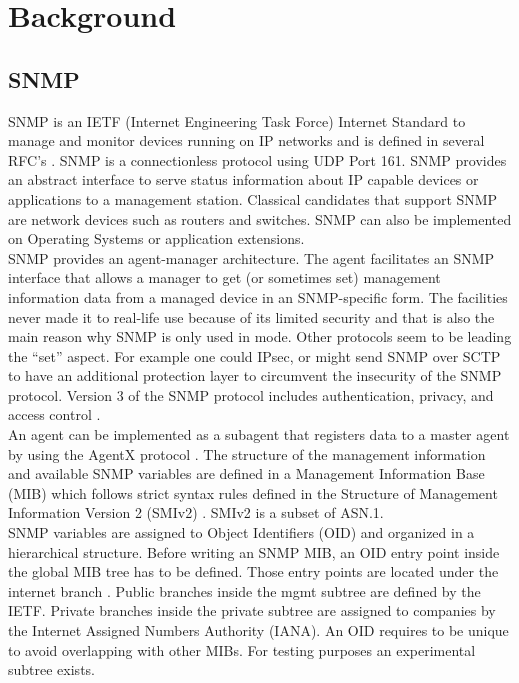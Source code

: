 \section{Background}
\label{chap:background}
\subsection{SNMP}
SNMP is an IETF (Internet Engineering Task Force) Internet Standard to manage and monitor devices running on IP networks and is defined in several RFC's \cite{snmp-rfc}. SNMP is a connectionless protocol using UDP Port 161. SNMP provides an abstract interface to serve status information about IP capable devices or applications to a management station. Classical candidates that support SNMP are network devices such as routers and switches. SNMP can also be implemented on Operating Systems or application extensions. 
\\
SNMP provides an agent-manager architecture. The agent facilitates an SNMP interface that allows a manager to get (or sometimes set) management information data from a managed device in an SNMP-specific form.
The  facilities never made it to real-life use because of its limited security and that is also the main reason why SNMP is only used in  mode. Other protocols seem to be leading the “set” aspect. For example one could IPsec, or might send SNMP over SCTP to have an additional protection layer to circumvent the insecurity of the SNMP protocol. Version 3 of the SNMP protocol includes authentication, privacy, and access control \cite{cisco-snmp}. 
 \\
An agent can be implemented as a subagent that registers data to a master agent by using the AgentX protocol \cite{agentx}. The structure of the management information and available SNMP variables are defined in a Management Information Base (MIB) which follows strict syntax rules defined in the Structure of Management Information Version 2 (SMIv2) \cite{smiv2}. SMIv2 is a subset of ASN.1. 
\\
SNMP variables are assigned to Object Identifiers (OID) and organized in a hierarchical structure. Before writing an SNMP MIB, an OID entry point inside the global MIB tree has to be defined. Those entry points are located under the internet branch \cite{oid1}. Public branches  inside the mgmt subtree are defined by the IETF. Private branches inside the private subtree are assigned to companies by the Internet Assigned Numbers Authority (IANA). An OID requires to be unique to avoid overlapping with other MIBs. For testing purposes an experimental subtree exists. 

